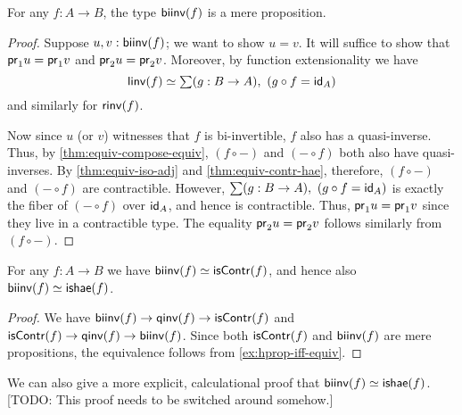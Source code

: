 \begin{thm}\label{thm:isprop-biinv}
  For any $f:A\to B$, the type $\biinv(f)$ is a mere proposition.
\end{thm}
\begin{proof}
  Suppose $u,v:\biinv(f)$; we want to show $u=v$.
  It will suffice to show that $\proj1u = \proj1v$ and $\proj2u=\proj2v$.
  Moreover, by function extensionality we have
  \[\eqv{\linv(f)}{\sm{g:B\to A} (g\circ f = \idfunc[A])}\]
  and similarly for $\rinv(f)$.

  Now since $u$ (or $v$) witnesses that $f$ is bi-invertible, $f$ also has a quasi-inverse.
  Thus, by \autoref{thm:equiv-compose-equiv}, $(f\circ -)$ and $(-\circ f)$ both also have quasi-inverses.
  By \autoref{thm:equiv-iso-adj} and \autoref{thm:equiv-contr-hae}, therefore, $(f\circ -)$ and $(-\circ f)$ are contractible.
  However, ${\sm{g:B\to A} (g\circ f = \idfunc[A])}$ is exactly the fiber of $(-\circ f)$ over $\idfunc[A]$, and hence is contractible.
  Thus, $\proj1u = \proj1v$ since they live in a contractible type.
  The equality $\proj2u=\proj2v$ follows similarly from $(f\circ -)$.
\end{proof}

\begin{cor}\label{thm:equiv-biinv-isequiv}
  For any $f:A\to B$ we have $\eqv{\biinv(f)}{\iscontr(f)}$, and hence also $\eqv{\biinv(f)}{\ishae(f)}$.
\end{cor}
\begin{proof}
  We have $\biinv(f) \to \qinv(f) \to \iscontr(f)$ and $\iscontr(f) \to \qinv(f) \to \biinv(f)$.
  Since both $\iscontr(f)$ and $\biinv(f)$ are mere propositions, the equivalence follows from \autoref{ex:hprop-iff-equiv}.
\end{proof}

We can also give a more explicit, calculational proof that $\eqv{\biinv(f)}{\ishae(f)}$.
[TODO: This proof needs to be switched around somehow.]

